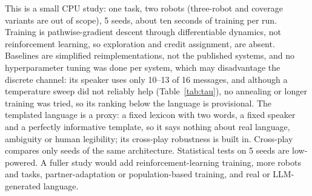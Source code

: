 This is a small CPU study: one task, two robots (three-robot and coverage variants are out of scope), 5 seeds, about ten seconds of training per run. Training is pathwise-gradient descent through differentiable dynamics, not reinforcement learning, so exploration and credit assignment, are absent. Baselines are simplified reimplementations, not the published systems, and no hyperparameter tuning was done per system, which may disadvantage the discrete channel: its speaker uses only 10--13 of 16 messages, and although a temperature sweep did not reliably help (Table~\ref{tab:tau}), no annealing or longer training was tried, so its ranking below the language is provisional. The templated language is a proxy: a fixed lexicon with two words, a fixed speaker and a perfectly informative template, so it says nothing about real language, ambiguity or human legibility; its cross-play robustness is built in. Cross-play compares only seeds of the same architecture. Statistical tests on 5 seeds are low-powered. A fuller study would add reinforcement-learning training, more robots and tasks, partner-adaptation or population-based training, and real or LLM-generated language.
